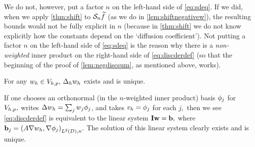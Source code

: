 We do not, however, put a factor $n$ on the left-hand side of \cref{eq:sdeq}. If we did, when we apply \cref{thm:shift} to $\mathcal S_{n} \widetilde{f}$ (as we do in \cref{lem:shiftnegativew}), the resulting bounds would not be fully explicit in $n$ (because in \cref{thm:shift} we do not know explicitly how the constants depend on the `diffusion coefficient'). Not putting a factor $n$ on the left-hand side of \cref{eq:sdeq} is the reason why there is a \emph{non-weighted} inner product on the right-hand side of \cref{eq:discderdef} (so that the beginning of the proof of \cref{lem:negdiscsum}, as mentioned above, works).
\ere

\label{lem:ddwd}
For any $w_{h} \in V_{h,p},$ $\Delta_{h} w_{h}$ exists and is unique.
\ele

If one chooses an orthonormal (in the $n$-weighted inner product) basis  $\phi_{j}$ for $V_{h,p},$ writes $\Delta w_{h} = \sum_j w_{j} \phi_{j}$, and takes $v_{h} = \phi_{j}$ for each $j,$ then we see \cref{eq:discderdef} is equivalent to the linear system $\mathbf{I} \mathbf{w} = \mathbf{b},$ where $\bb_{j} = \IPLtDn{A \grad \wh}{\grad \phij}.$ The solution of this linear system clearly exists and is unique.
\epf


